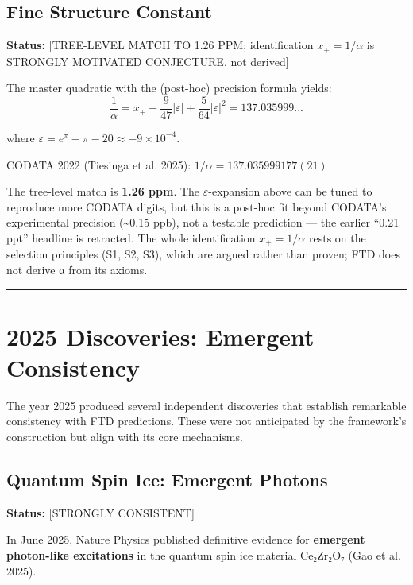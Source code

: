 \documentclass[
  11pt,
  letterpaper,
  twoside,
  openany]{book}
\makeatletter
\let\orig@section\section
\renewcommand{\section}{\needspace{8\baselineskip}\orig@section}
\let\orig@subsection\subsection
\renewcommand{\subsection}{\needspace{6\baselineskip}\orig@subsection}
\makeatother
\begin{document}
\subsection{Fine Structure Constant}\label{fine-structure-constant-1}

\textbf{Status:} {[}TREE-LEVEL MATCH TO 1.26 PPM; identification
\(x_+=1/\alpha\) is STRONGLY MOTIVATED CONJECTURE, not derived{]}

The master quadratic with the (post-hoc) precision formula yields:
\[\frac{1}{\alpha} = x_+ - \frac{9}{47}|\varepsilon| + \frac{5}{64}|\varepsilon|^2 = 137.035999...\]

where \(\varepsilon = e^\pi - \pi - 20 \approx -9 \times 10^{-4}\).

CODATA 2022 (Tiesinga et al. 2025): \(1/\alpha = 137.035999177(21)\)

The tree-level match is \textbf{1.26 ppm}. The \(\varepsilon\)-expansion
above can be tuned to reproduce more CODATA digits, but this is a
post-hoc fit beyond CODATA's experimental precision (\textasciitilde0.15
ppb), not a testable prediction --- the earlier ``0.21 ppt'' headline is
retracted. The whole identification \(x_+ = 1/\alpha\) rests on the
selection principles (S1, S2, S3), which are argued rather than proven;
FTD does not derive α from its axioms.

\begin{center}\rule{0.5\linewidth}{0.5pt}\end{center}

\section{2025 Discoveries: Emergent
Consistency}\label{sec-2025-discoveries}

The year 2025 produced several independent discoveries that establish
remarkable consistency with FTD predictions. These were not anticipated
by the framework's construction but align with its core mechanisms.

\subsection{Quantum Spin Ice: Emergent
Photons}\label{sec-quantum-spin-ice}

\textbf{Status:} {[}STRONGLY CONSISTENT{]}

In June 2025, Nature Physics published definitive evidence for
\textbf{emergent photon-like excitations} in the quantum spin ice
material Ce₂Zr₂O₇ (Gao et al. 2025).
\end{document}
